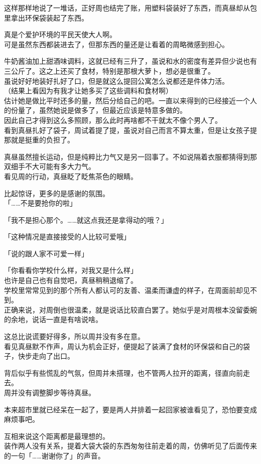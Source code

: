 这样那样地说了一堆话，正好周也结完了账，用塑料袋装好了东西，而真昼却从包里拿出环保袋装起了东西。

真是个爱护环境的平民天使大人啊。\\

可是虽然东西都装进去了，但那东西的量还是让看着的周略微感到担心。

牛奶酱油加上甜酒味调料，这就已经有三升了，虽说和水的密度有差异但少说也有三公斤了。这之上还买了食材，特别是那根大萝卜，想必是很重了。\\

虽说好好地装好扎好了口，但是就这么提回公寓怎么说都还是件体力活。\\

（结果上看因为有我才让她多买了这些调料和食材啊）\\

估计她是做比平时还多的量，然后分给自己的吧。一直以来得到的已经接近一个人的份量了，虽然她说是做多了，但最近应该是特意多做的。\\

因此自己才得到这么多照顾，那么此时再啥都不干就太不像个男人了。\\

看到真昼扎好了袋子，周试着提了提，虽说对自己而言不算太重，但是让女孩子提那就是挺重的负担了。

真昼虽然擅长运动，但是纯粹比力气又是另一回事了。不如说隔着衣服都猜得到那双细手不大可能有多大力气。\\

看见周的行动，真昼眨了眨焦茶色的眼睛。

比起惊讶，更多的是感谢的氛围。\\

「……不是要抢你的啦」

「我不是担心那个。……就这点我还是拿得动的哦？」

「这种情况是直接接受的人比较可爱哦」

「说的跟人家不可爱一样」

「你看看你学校什么样，对我又是什么样」\\

也许是自己也有自觉吧，真昼稍稍退缩了。\\

学校里常常见到的那个所有人都认可的友善、温柔而谦虚的样子，在周面前却见不到。\\

正确来说，对周倒也很温柔，就是说话比较直白罢了。她似乎是对周根本没留委婉的余地，说话一直是有啥说啥。

这总比说谎要好得多，所以周并没有多在意。\\

看见真昼默不作声，周认为机会正好，便提起了装满了食材的环保袋和自己的袋子，快步走向了出口。

背后似乎有些慌乱的气氛，但周并未搭理，也不管两人拉开的距离，径直向前走去。\\

周并没有调整脚步等待真昼。

本来超市里就已经呆在一起了，要是两人并排着一起回家被谁看见了，恐怕要变成麻烦事吧。

互相来说这个距离都是最理想的。\\

装作两人没有关系，提着大袋大袋的东西匆匆往前走着的周，仿佛听见了后面传来的一句「……谢谢你了」的声音。

